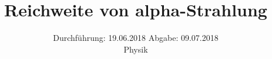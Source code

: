

\subject{V701}
\title{Reichweite von alpha-Strahlung}
\date{%
  Durchführung: 19.06.2018
  \hspace{3em}
  Abgabe: 09.07.2018 \\
  Physik
}



\maketitle
\thispagestyle{empty}
\tableofcontents
\newpage






\printbibliography{}


